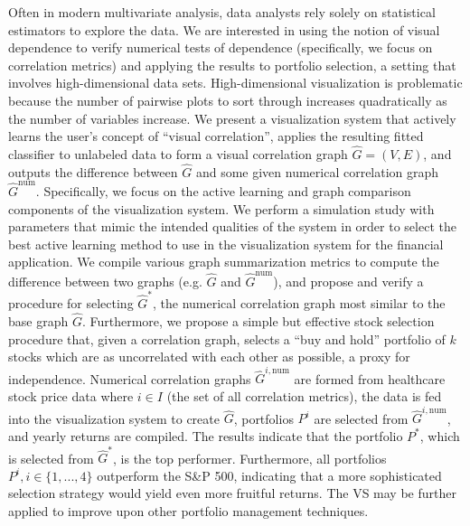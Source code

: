 Often in modern multivariate analysis, data analysts rely solely on statistical
estimators to explore the data. We are interested in using the notion of visual 
dependence to verify numerical tests of dependence (specifically, we 
focus on correlation metrics) and applying the results to portfolio selection, 
a setting that involves high-dimensional data sets. High-dimensional 
visualization is problematic because the number of pairwise plots to sort 
through increases quadratically as the number of variables increase.
We present a visualization system that actively learns the user's concept of
``visual correlation'', applies the resulting fitted classifier to unlabeled 
data to form a visual correlation graph $\hat{G}=(V,E)$, and outputs the 
difference between $\hat{G}$ and some given numerical correlation graph 
$\hat{G}^{\text{num}}$.
Specifically, we focus on the active learning and graph comparison components 
of the visualization system. We perform a simulation study with parameters that 
mimic the intended qualities of the system in order to select the best active 
learning method to use in the visualization system for the financial 
application. We compile various graph summarization metrics to compute the 
difference between two graphs (e.g. $\hat{G}$ and $\hat{G}^{\text{num}}$), and 
propose and verify a procedure for selecting $\hat{G}^*$, the numerical 
correlation graph most similar to the base graph $\hat{G}$. Furthermore, we 
propose a simple but effective stock selection 
procedure that, given a correlation graph,  selects a ``buy and hold'' 
portfolio of $k$ stocks which are as uncorrelated with each other as possible, 
a proxy for independence. 
Numerical correlation graphs $\hat{G}^{i, \text{num}}$ are formed from 
healthcare stock price data where $i \in I$ (the set of all correlation 
metrics), the data is fed into the visualization system to create $\hat{G}$, 
portfolios $P^i$ are selected from $\hat{G}^{i, \text{num}}$, and yearly 
returns are compiled. The results indicate that the portfolio $P^*$, which 
is selected from $\hat{G}^*$, is the top performer. Furthermore, all portfolios 
$P^i, i \in \{1,...,4\}$ outperform the S\&P 500, indicating that 
a more sophisticated selection strategy would yield even more fruitful returns. 
The VS may be further applied to improve upon other portfolio management 
techniques.